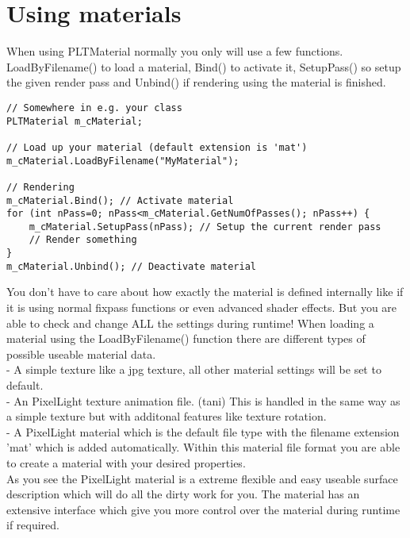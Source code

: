 \section{Using materials}
When using PLTMaterial normally you only will use a few functions. LoadByFilename() to load a material,
Bind() to activate it, SetupPass() so setup the given render pass and Unbind() if rendering using the
material is finished.\\

\begin{lstlisting}[caption=Using materials]
// Somewhere in e.g. your class
PLTMaterial m_cMaterial;

// Load up your material (default extension is 'mat')
m_cMaterial.LoadByFilename("MyMaterial");

// Rendering
m_cMaterial.Bind(); // Activate material
for (int nPass=0; nPass<m_cMaterial.GetNumOfPasses(); nPass++) {
    m_cMaterial.SetupPass(nPass); // Setup the current render pass
    // Render something
}
m_cMaterial.Unbind(); // Deactivate material
\end{lstlisting}

You don't have to care about how exactly the material is defined internally like if it is using
normal fixpass functions or even advanced shader effects. But you are able to check and change ALL
the settings during runtime!
When loading a material using the LoadByFilename() function there are different types of possible useable
material data.\\
- A simple texture like a jpg texture, all other material settings will be set to default.\\
- An PixelLight texture animation file. (tani) This is handled in the same way as a simple texture
  but with additonal features like texture rotation.\\
- A PixelLight material which is the default file type with the filename extension 'mat' which is
  added automatically. Within this material file format you are able to create a material with your
  desired properties.\\

As you see the PixelLight material is a extreme flexible and easy useable surface description which will do
all the dirty work for you. The material has an extensive interface which give you more control
over the material during runtime if required.




